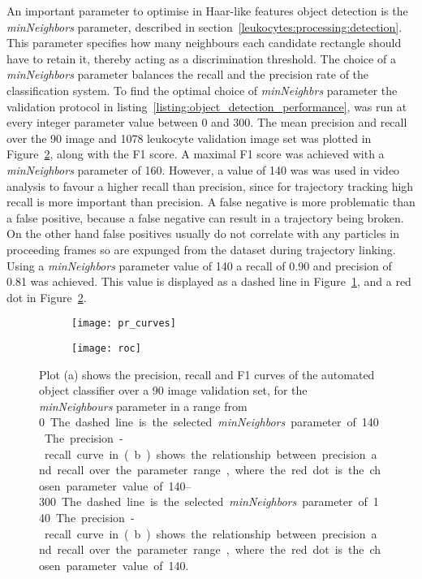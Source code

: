 An important parameter to optimise in Haar-like features object detection is the \emph{minNeighbors} parameter, described in section~\ref{leukocytes:processing:detection}. This parameter specifies how many neighbours each candidate rectangle should have to retain it, thereby acting as a discrimination threshold. The choice of a \emph{minNeighbors} parameter balances the recall and the precision rate of the classification system. To find the optimal choice of \emph{minNeighbrs} parameter the validation protocol in listing~\ref{listing:object_detection_performance}, was run at every integer parameter value between 0 and 300. The mean precision and recall over the 90 image and 1078 leukocyte validation image set was plotted in Figure~\ref{figure:pr_roc:roc}, along with the F1 score. A maximal F1 score was achieved with a \emph{minNeighbors} parameter of 160. However, a value of 140 was was used in video analysis to favour a higher recall than precision, since for trajectory tracking high recall is more important than precision. A false negative is more problematic than a false positive, because a false negative can result in a trajectory being broken. On the other hand false positives usually do not correlate with any particles in proceeding frames so are expunged from the dataset during trajectory linking. Using a \emph{minNeighbors} parameter value of 140 a recall of 0.90 and precision of 0.81 was achieved. This value is displayed as a dashed line in Figure~\ref{figure:pr_roc:pr_curve}, and a red dot in Figure~\ref{figure:pr_roc:roc}.

\begin{figure}[htbp]{}
	\centering
	\begin{subfigure}[b]{0.72\linewidth}
		\texttt{[image: pr\_curves]}
		\caption{}
		\label{figure:pr_roc:pr_curve}
	\end{subfigure}
	\begin{subfigure}[b]{0.74\linewidth}
		\texttt{[image: roc]}
		\caption{}
		\label{figure:pr_roc:roc}
	\end{subfigure}
\caption[Precision, recall and F1 score over parameter range]{Plot (a) shows the precision, recall and F1 curves of the automated object classifier over a 90 image validation set, for the \emph{minNeighbours} parameter in a range from \SIrange{0}{300}. The dashed line is the selected \emph{minNeighbors} parameter of 140. The precision-recall curve in (b) shows the relationship between precision and recall over the parameter range, where the red dot is the chosen parameter value of 140.}
\label{figure:pr_roc}
\end{figure}

